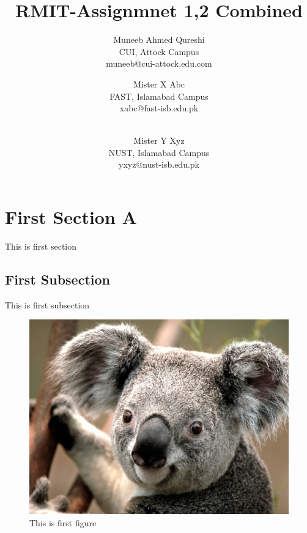 \documentclass[titlepage]{article}
\begin{document}
\title{RMIT-Assignmnet 1,2 Combined}
\author
{
	Muneeb Ahmed Qureshi\\
	CUI, Attock Campus\\
	muneeb@cui-attock.edu.com 
	\and 
	Mister X Abc\\
	FAST, Islamabad Campus\\
	xabc@fast-isb.edu.pk
	\and
	\\Mister Y Xyz\\
	NUST, Islamabad Campus \\
	yxyz@nust-isb.edu.pk
}
\maketitle
\section{First Section A}
This is first section
\subsection{First Subsection}
This is first subsection
\begin{figure}[h]
	\includegraphics[width=\linewidth]{koala}
	\caption{This is first figure}
\end{figure}
\end{document}
